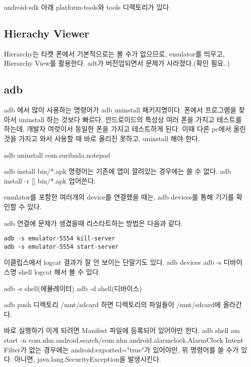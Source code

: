android-sdk 아래 platform-tools와 tools 디렉토리가 있다.

\subsection{Hierachy Viewer}
Hierarchy는 타켓 폰에서 기본적으로는 볼 수가 없으므로, emulator를 띄우고, Hierarchy View를 활용한다.
adt가 버전업되면서 문제가 사라졌다.(확인 필요..)

\subsection{adb}
adb 에서 많이 사용하는 명령어가 adb uninstall  패키지명이다.
폰에서 프로그램을 찾아서 uninstall 하는 것보다 빠르다.
안드로이드의 특성상 여러 폰을 가지고 테스트를 하는데, 개발자 여럿이서 동일한 폰을 가지고 테스트하게 된다.
이때 다른 pc에서 올린 것을 가지고 와서 사용할 때 바로 올리진 못하고, uninstall 해야 한다.

adb uninstall com.suribada.notepad

adb install bin/*.apk 명령어는 기존에 앱이 깔려있는 경우에는 쓸 수 없다.
adb install -r [] bin/*.apk 업어쓴다.

emulator를 포함한 여러개의 device를 연결했을 때는, 
adb devices를 통해 기기를 확인할 수 있다.

adb 연결에 문제가 생겼을때 리스타트하는 방법은 다음과 같다.

\begin{verbatim}
adb -s emulator-5554 kill-server
adb -s emulator-5554 start-server
\end{verbatim}

이클립스에서 logcat 결과가 잘 안 보이는 단말기도 있다.
adb devices
adb -s 디바이스명 shell
logcat 해서 볼 수 있다.

adb -e shell(에뮬레이터)
adb -d shell(디바이스)


adb push 디렉토리 /mnt/sdcard 하면 디렉토리의 파일들이 /mnt/sdcard에 올라간다.

바로 실행하기
이게 되려면 Manifest 파일에 등록되어 있어야만 한다.
adb shell am start -n com.nhn.android.search/com.nhn.android.alarmclock.AlarmClock
Intent Filter가 없는 경우에는 android:exported="true"가 있어야만, 위 명령어를 쓸 수가 있다.
아니면, java.lang.SecurityException을 발생시킨다.


